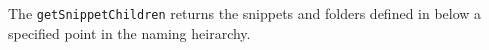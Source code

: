 The \verb+getSnippetChildren+ returns the snippets and folders defined in \Rapture below a specified
point in the naming heirarchy.
